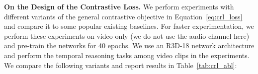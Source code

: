 \documentclass[letterpaper]{article} %
\begin{document}




\noindent \textbf{On the Design of the Contrastive Loss.}
We perform experiments with different variants of the general contrastive objective in Equation~\ref{eq:crl_loss} and compare it to some popular existing baselines. 
For faster experimentation, we perform these experiments on video only (we do not use the audio channel here) and pre-train the networks for 40 epochs.
We use an R3D-18 network architecture and perform the temporal reasoning tasks among video clips in the experiments.
We compare the following variants and report results in Table~\ref{tab:crl_abl}: 
\end{document}
